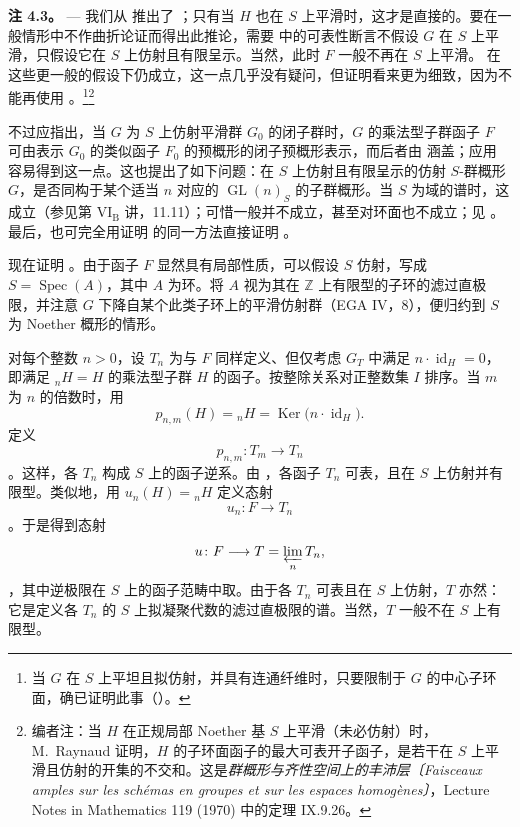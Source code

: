 \medskip\noindent{}\textbf{注 4.3。} --- 我们从  推出了 ；只有当 \(H\) 也在 \(S\) 上平滑时，这才是直接的。要在一般情形中不作曲折论证而得出此推论，需要  中的可表性断言不假设 \(G\) 在 \(S\) 上平滑，只假设它在 \(S\) 上仿射且有限呈示。当然，此时 \(F\) 一般不再在 \(S\) 上平滑。 在这些更一般的假设下仍成立，这一点几乎没有疑问，但证明看来更为细致，因为不能再使用 。\footnote{当 \(G\) 在 \(S\) 上平坦且拟仿射，并具有连通纤维时，只要限制于 \(G\) 的中心子环面，确已证明此事（）。}\footnote{编者注：当 \(H\) 在正规局部 Noether 基 \(S\) 上平滑（未必仿射）时，M.~Raynaud 证明，\(H\) 的子环面函子的最大可表开子函子，是若干在 \(S\) 上平滑且仿射的开集的不交和。这是\emph{群概形与齐性空间上的丰沛层〔Faisceaux amples sur les schémas en groupes et sur les espaces homogènes〕}，Lecture Notes in Mathematics 119 (1970) 中的定理 IX.9.26。}

不过应指出，当 \(G\) 为 \(S\) 上仿射平滑群 \(G_0\) 的闭子群时，\(G\) 的乘法型子群函子 \(F\) 可由表示 \(G_0\) 的类似函子 \(F_0\) 的预概形的闭子预概形表示，而后者由  涵盖；应用  容易得到这一点。这也提出了如下问题：在 \(S\) 上仿射且有限呈示的仿射 \(S\)-群概形 \(G\)，是否同构于某个适当 \(n\) 对应的 \(\operatorname{GL}(n)_S\) 的子群概形。当 \(S\) 为域的谱时，这成立（参见第 \(\mathrm{VI}_{\mathrm B}\) 讲，11.11）；可惜一般并不成立，甚至对环面也不成立；见 。最后，也可完全用证明  的同一方法直接证明 。

现在证明 。由于函子 \(F\) 显然具有局部性质，可以假设 \(S\) 仿射，写成 \(S=\operatorname{Spec}(A)\)，其中 \(A\) 为环。将 \(A\) 视为其在 \(\mathbb Z\) 上有限型的子环的滤过直极限，并注意 \(G\) 下降自某个此类子环上的平滑仿射群（EGA IV，8），便归约到 \(S\) 为 Noether 概形的情形。

对每个整数 \(n>0\)，设 \(T_n\) 为与 \(F\) 同样定义、但仅考虑 \(G_T\) 中满足 \(n\cdot\operatorname{id}_H=0\)，即满足 \({}_nH=H\) 的乘法型子群 \(H\) 的函子。按整除关系对正整数集 \(I\) 排序。当 \(m\) 为 \(n\) 的倍数时，用 \[
  p_{n,m}(H)={}_nH=\operatorname{Ker}
  \bigl(n\cdot\operatorname{id}_H\bigr).
\] 定义  \[
  p_{n,m}\colon T_m\longrightarrow T_n
\]。这样，各 \(T_n\) 构成 \(S\) 上的函子逆系。由 ，各函子 \(T_n\) 可表，且在 \(S\) 上仿射并有限型。类似地，用 \(u_n(H)={}_nH\) 定义态射  \[
  u_n\colon F\longrightarrow T_n
\]。于是得到态射  \[
  u\colon F\longrightarrow T=\varprojlim_n T_n,
\]，其中逆极限在 \(S\) 上的函子范畴中取。由于各 \(T_n\) 可表且在 \(S\) 上仿射，\(T\) 亦然：它是定义各 \(T_n\) 的 \(S\) 上拟凝聚代数的滤过直极限的谱。当然，\(T\) 一般不在 \(S\) 上有限型。


